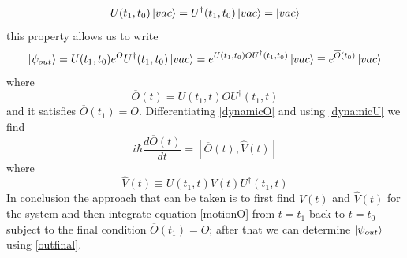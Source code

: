 \documentclass[12pt]{book}
\begin{document}
\begin{equation}U(t_1,t_0)\ket{vac}= U^\dagger(t_1,t_0)\ket{vac}= \ket{vac}\end{equation}
this property allows us to write
\begin{equation}\ket{\psi_{out}} = U(t_1,t_0)e^OU^\dagger(t_1,t_0)\ket{vac} = e^{U(t_1,t_0)OU^\dagger(t_1,t_0) }\ket{vac}\equiv e^{\overline{O}(t_0)}\ket{vac}\end{equation}
where 
\begin{equation}\label{dynamicO}\overline{O}(t) = U(t_1,t)OU^\dagger(t_1,t)\end{equation}
and it satisfies $\overline{O}(t_1) = O$. Differentiating \eqref{dynamicO} and using \eqref{dynamicU} we find
\begin{equation}\label{motionO}i\hbar \frac{d\overline{O}(t)}{dt} = [\overline{O}(t),\hat{V}(t)]\end{equation}
where
\begin{equation}\hat{V}(t) \equiv U(t_1,t)V(t)U^\dagger(t_1,t)\end{equation}
In conclusion the approach that can be taken is to first find $V(t)$ and $\hat{V}(t)$ for the system and then integrate equation \eqref{motionO} from $t=t_1$ back to $t=t_0$ subject to the final condition $\overline{O}(t_1) = O$; after that we can determine $\ket{\psi_{out}}$ using \eqref{outfinal}.





\end{document}
